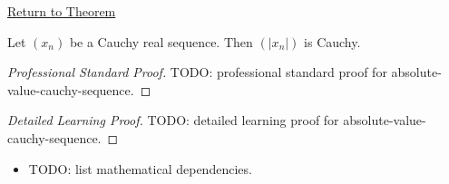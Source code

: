 \newpage
{}
\label{prf:absolute-value-cauchy-sequence}

\begin{remark*}[Return]
\hyperref[thm:absolute-value-cauchy-sequence]{Return to Theorem}
\end{remark*}

\begin{theorem*}
Let $(x_n)$ be a Cauchy real sequence. Then $(|x_n|)$ is Cauchy.

\smallskip
\noindent
\end{theorem*}

\begin{proof}[Professional Standard Proof]
\LRAProofBodyStart
TODO: professional standard proof for absolute-value-cauchy-sequence.
\end{proof}

\begin{proof}[Detailed Learning Proof]
\LRAProofBodyStart
TODO: detailed learning proof for absolute-value-cauchy-sequence.
\end{proof}

\begin{remark*}
\end{remark*}

\begin{dependencies}
\begin{itemize}
  \item TODO: list mathematical dependencies.
\end{itemize}
\end{dependencies}

\clearpage
